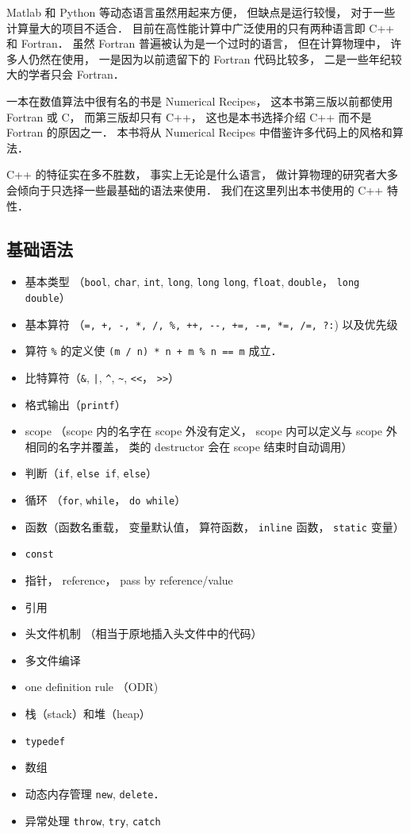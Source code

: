 
Matlab 和 Python 等动态语言虽然用起来方便， 但缺点是运行较慢， 对于一些计算量大的项目不适合． 目前在高性能计算中广泛使用的只有两种语言即 C++ 和 Fortran． 虽然 Fortran 普遍被认为是一个过时的语言， 但在计算物理中， 许多人仍然在使用， 一是因为以前遗留下的 Fortran 代码比较多， 二是一些年纪较大的学者只会 Fortran．

一本在数值算法中很有名的书是 Numerical Recipes， 这本书第三版以前都使用 Fortran 或 C， 而第三版却只有 C++， 这也是本书选择介绍 C++ 而不是 Fortran 的原因之一． 本书将从 Numerical Recipes 中借鉴许多代码上的风格和算法．

C++ 的特征实在多不胜数， 事实上无论是什么语言， 做计算物理的研究者大多会倾向于只选择一些最基础的语法来使用．
我们在这里列出本书使用的 C++ 特性．

\subsection{基础语法}
\begin{itemize}
\item 基本类型 （\verb|bool|, \verb|char|, \verb|int|, \verb|long|, \verb|long| \verb|long|, \verb|float|, \verb|double|， \verb|long double|）
\item 基本算符 （\verb|=, +, -, *, /, %, ++, --, +=, -=, *=, /=, ?:|) 以及优先级
\item 算符 \verb|%| 的定义使 \verb|(m / n) * n + m % n == m| 成立．
\item 比特算符（\verb|&|, \verb+|+, \verb|^|, \verb|~|, \verb|<<|， \verb|>>|）
\item 格式输出（\verb|printf|）
\item scope （scope 内的名字在 scope 外没有定义， scope 内可以定义与 scope 外相同的名字并覆盖， 类的 destructor 会在 scope 结束时自动调用）
\item 判断（\verb|if|, \verb|else if|, \verb|else|）
\item 循环 （\verb|for|, \verb|while|， \verb|do while|）
\item 函数（函数名重载， 变量默认值， 算符函数， \verb|inline| 函数， \verb|static| 变量）
\item \verb|const|
\item 指针， reference， pass by reference/value
\item 引用
\item 头文件机制 （相当于原地插入头文件中的代码）
\item 多文件编译
\item one definition rule （ODR)
\item 栈（stack）和堆（heap）
\item \verb|typedef|
\item 数组
\item 动态内存管理 \verb|new|, \verb|delete|．
\item 异常处理 \verb|throw|, \verb|try|, \verb|catch|
\end{itemize}

